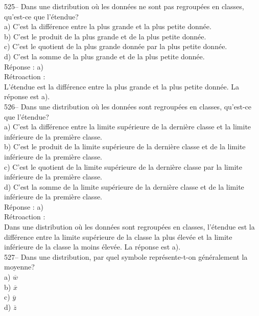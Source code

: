 ﻿\documentclass[letterpaper, 12pt]{article}
\begin{document}
525-- Dans une distribution o\`u les donn\'ees ne sont pas regroup\'ees en
classes, qu'est-ce que l'\'etendue?\\
a) C'est la diff\'erence entre la plus grande et la plus petite donn\'ee.\\
b) C'est le produit de la plus grande et de la plus petite donn\'ee.\\
c) C'est le quotient de la plus grande donn\'ee par la plus petite
donn\'ee.\\
d) C'est la somme de la plus grande et de la plus petite donn\'ee.\\

R\'eponse : a)\\

R\'etroaction : \\
L'\'etendue est la diff\'erence entre la plus grande et la plus petite
donn\'ee.  La r\'eponse est a).\\

526-- Dans une distribution o\`u les donn\'ees sont regroup\'ees en classes,
qu'est-ce que l'\'etendue?\\
a) C'est la diff\'erence entre la limite sup\'erieure de la derni\`ere
classe et la limite inf\'erieure de la premi\`ere classe.\\
b) C'est le produit de la limite sup\'erieure de la derni\`ere classe et de
la limite inf\'erieure de la premi\`ere classe.\\
c) C'est le quotient de la limite sup\'erieure de la derni\`ere classe par
la limite inf\'erieure de la premi\`ere classe.\\
d) C'est la somme de la limite sup\'erieure de la derni\`ere classe et de la
limite inf\'erieure de la premi\`ere classe.\\

R\'eponse : a) \\

R\'etroaction : \\
Dans une distribution o\`u les donn\'ees sont regroup\'ees en classes,
l'\'etendue est la diff\'erence entre la limite sup\'erieure de la classe la
plus \'elev\'ee et la limite inf\'erieure de la classe la moins \'elev\'ee.
La r\'eponse est a).\\

527-- Dans une distribution, par quel symbole repr\'esente-t-on
g\'en\'eralement la moyenne?\\
a) $\overline{w}$\\
b) $\overline{x}$\\
c) $\overline{y}$\\
d) $\overline{z}$\\
\end{document}
